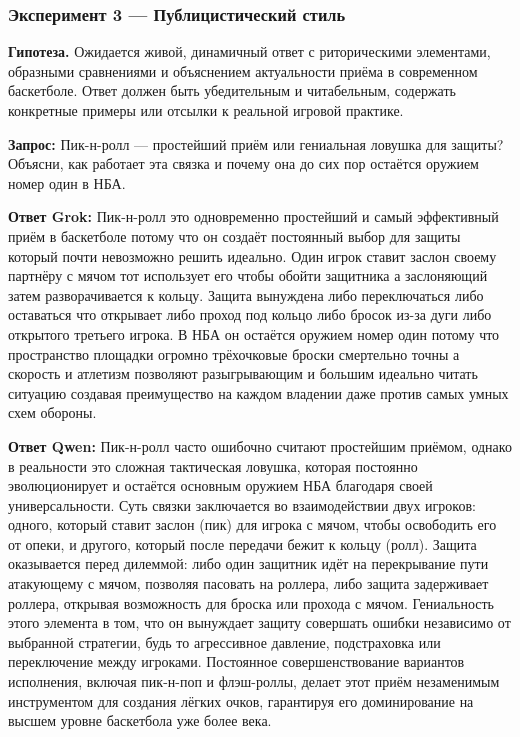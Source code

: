 \documentclass[a4paper, final]{article}
\begin{document}
\newpage

\subsubsection{Эксперимент 3 — Публицистический стиль}

\noindent\textbf{Гипотеза.} Ожидается живой, динамичный ответ с риторическими элементами, образными сравнениями и объяснением актуальности приёма в современном баскетболе. Ответ должен быть убедительным и читабельным, содержать конкретные примеры или отсылки к реальной игровой практике.

\noindent\textbf{Запрос:} Пик-н-ролл — простейший приём или гениальная ловушка для защиты? Объясни, как работает эта связка и почему она до сих пор остаётся оружием номер один в НБА.

\noindent\textbf{Ответ Grok:} Пик-н-ролл это одновременно простейший и самый эффективный приём в баскетболе потому что он создаёт постоянный выбор для защиты который почти невозможно решить идеально. Один игрок ставит заслон своему партнёру с мячом тот использует его чтобы обойти защитника а заслоняющий затем разворачивается к кольцу. Защита вынуждена либо переключаться либо оставаться что открывает либо проход под кольцо либо бросок из-за дуги либо открытого третьего игрока. В НБА он остаётся оружием номер один потому что пространство площадки огромно трёхочковые броски смертельно точны а скорость и атлетизм позволяют разыгрывающим и большим идеально читать ситуацию создавая преимущество на каждом владении даже против самых умных схем обороны.

\noindent\textbf{Ответ Qwen:} Пик-н-ролл часто ошибочно считают простейшим приёмом, однако в реальности это сложная тактическая ловушка, которая постоянно эволюционирует и остаётся основным оружием НБА благодаря своей универсальности. Суть связки заключается во взаимодействии двух игроков: одного, который ставит заслон (пик) для игрока с мячом, чтобы освободить его от опеки, и другого, который после передачи бежит к кольцу (ролл). Защита оказывается перед дилеммой: либо один защитник идёт на перекрывание пути атакующему с мячом, позволяя пасовать на роллера, либо защита задерживает роллера, открывая возможность для броска или прохода с мячом. Гениальность этого элемента в том, что он вынуждает защиту совершать ошибки независимо от выбранной стратегии, будь то агрессивное давление, подстраховка или переключение между игроками. Постоянное совершенствование вариантов исполнения, включая пик-н-поп и флэш-роллы, делает этот приём незаменимым инструментом для создания лёгких очков, гарантируя его доминирование на высшем уровне баскетбола уже более века.
\end{document}
